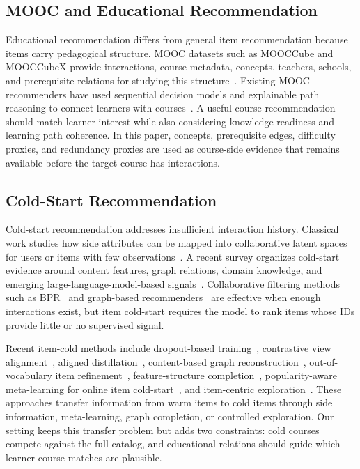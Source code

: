 \documentclass[sigconf,anonymous,review]{acmart}
\begin{document}
\subsection{MOOC and Educational Recommendation}
Educational recommendation differs from general item recommendation because items carry pedagogical structure. MOOC datasets such as MOOCCube and MOOCCubeX provide interactions, course metadata, concepts, teachers, schools, and prerequisite relations for studying this structure~\cite{yu2020mooccube,wang2021mooccubex}. Existing MOOC recommenders have used sequential decision models and explainable path reasoning to connect learners with courses~\cite{zhang2019hrlcourse,dessi2024findingpaths}. A useful course recommendation should match learner interest while also considering knowledge readiness and learning path coherence. In this paper, concepts, prerequisite edges, difficulty proxies, and redundancy proxies are used as course-side evidence that remains available before the target course has interactions.

\subsection{Cold-Start Recommendation}
Cold-start recommendation addresses insufficient interaction history. Classical work studies how side attributes can be mapped into collaborative latent spaces for users or items with few observations~\cite{schein2002coldstart,gantner2010attribute}. A recent survey organizes cold-start evidence around content features, graph relations, domain knowledge, and emerging large-language-model-based signals~\cite{zhang2025coldstartllm}. Collaborative filtering methods such as BPR~\cite{rendle2009bpr} and graph-based recommenders~\cite{wang2019neuralgraphcollaborativefiltering,he2020lightgcn,ying2018graphconvolutional} are effective when enough interactions exist, but item cold-start requires the model to rank items whose IDs provide little or no supervised signal.

Recent item-cold methods include dropout-based training~\cite{volkovs2017dropoutnet}, contrastive view alignment~\cite{zhou2023ccfcrec}, aligned distillation~\cite{huang2023aldi}, content-based graph reconstruction~\cite{kim2024cgrc}, out-of-vocabulary item refinement~\cite{zhao2024usim}, feature-structure completion~\cite{zhao2025fsgnn}, popularity-aware meta-learning for online item cold-start~\cite{luo2025pam}, and item-centric exploration~\cite{jiang2025itemcentric}. These approaches transfer information from warm items to cold items through side information, meta-learning, graph completion, or controlled exploration. Our setting keeps this transfer problem but adds two constraints: cold courses compete against the full catalog, and educational relations should guide which learner-course matches are plausible.
\end{document}
